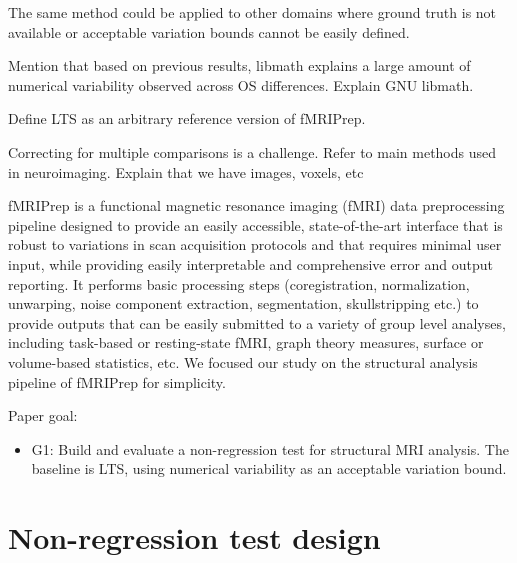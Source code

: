 \documentclass{article}
\begin{document}
    The same method could be applied to other domains where ground truth is not available or acceptable variation bounds cannot be easily defined.  

    Mention that based on previous results, libmath explains a large amount of numerical variability observed across OS differences. Explain GNU libmath.

    Define LTS as an arbitrary reference version of fMRIPrep.

Correcting for multiple comparisons is a challenge. Refer to main methods used in neuroimaging. Explain that we have images, voxels, etc

fMRIPrep is a functional magnetic resonance imaging (fMRI) data preprocessing pipeline designed to provide an easily accessible, state-of-the-art interface that is robust to variations in scan acquisition protocols and that requires minimal user input, while providing easily interpretable and comprehensive error and output reporting. It performs basic processing steps (coregistration, normalization, unwarping, noise component extraction, segmentation, skullstripping etc.) to provide outputs that can be easily submitted to a variety of group level analyses, including task-based or resting-state fMRI, graph theory measures, surface or volume-based statistics, etc. We focused our study on the structural analysis pipeline of fMRIPrep for simplicity. 


    

Paper goal:
\begin{itemize}
    \item G1: Build and evaluate a non-regression test for structural MRI analysis. The baseline is LTS, using numerical variability as an acceptable variation bound.
\end{itemize}



\section{Non-regression test design}

\end{document}
